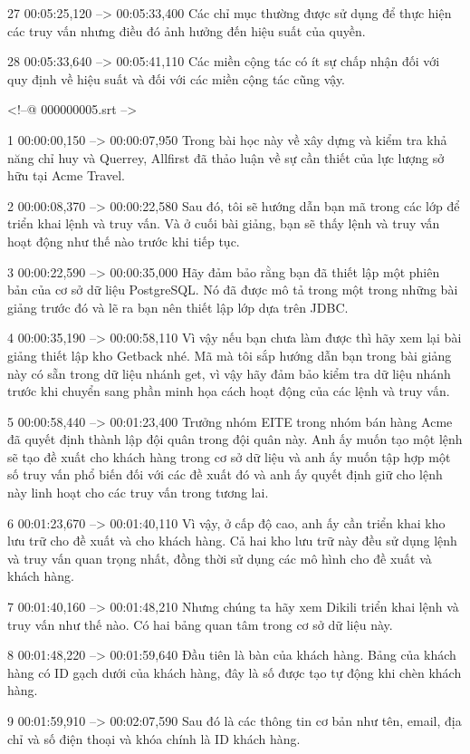 27
00:05:25,120 --> 00:05:33,400
Các chỉ mục thường được sử dụng để thực hiện các truy vấn nhưng điều đó ảnh hưởng đến hiệu suất của quyền.

28
00:05:33,640 --> 00:05:41,110
Các miền cộng tác có ít sự chấp nhận đối với quy định về hiệu suất và đối với các miền cộng tác cũng vậy.

<!--@ 000000005.srt -->

1
00:00:00,150 --> 00:00:07,950
Trong bài học này về xây dựng và kiểm tra khả năng chỉ huy và Querrey, Allfirst đã thảo luận về sự cần thiết của lực lượng sở hữu tại Acme Travel.

2
00:00:08,370 --> 00:00:22,580
Sau đó, tôi sẽ hướng dẫn bạn mã trong các lớp để triển khai lệnh và truy vấn.  Và ở cuối bài giảng, bạn sẽ thấy lệnh và truy vấn hoạt động như thế nào trước khi tiếp tục.

3
00:00:22,590 --> 00:00:35,000
Hãy đảm bảo rằng bạn đã thiết lập một phiên bản của cơ sở dữ liệu PostgreSQL.  Nó đã được mô tả trong một trong những bài giảng trước đó và lẽ ra bạn nên thiết lập lớp dựa trên JDBC.

4
00:00:35,190 --> 00:00:58,110
Vì vậy nếu bạn chưa làm được thì hãy xem lại bài giảng thiết lập kho Getback nhé.  Mã mà tôi sắp hướng dẫn bạn trong bài giảng này có sẵn trong dữ liệu nhánh get, vì vậy hãy đảm bảo kiểm tra dữ liệu nhánh trước khi chuyển sang phần minh họa cách hoạt động của các lệnh và truy vấn.

5
00:00:58,440 --> 00:01:23,400
Trưởng nhóm EITE trong nhóm bán hàng Acme đã quyết định thành lập đội quân trong đội quân này.  Anh ấy muốn tạo một lệnh sẽ tạo đề xuất cho khách hàng trong cơ sở dữ liệu và anh ấy muốn tập hợp một số truy vấn phổ biến đối với các đề xuất đó và anh ấy quyết định giữ cho lệnh này linh hoạt cho các truy vấn trong tương lai.

6
00:01:23,670 --> 00:01:40,110
Vì vậy, ở cấp độ cao, anh ấy cần triển khai kho lưu trữ cho đề xuất và cho khách hàng.  Cả hai kho lưu trữ này đều sử dụng lệnh và truy vấn quan trọng nhất, đồng thời sử dụng các mô hình cho đề xuất và khách hàng.

7
00:01:40,160 --> 00:01:48,210
Nhưng chúng ta hãy xem Dikili triển khai lệnh và truy vấn như thế nào.  Có hai bảng quan tâm trong cơ sở dữ liệu này.

8
00:01:48,220 --> 00:01:59,640
Đầu tiên là bàn của khách hàng.  Bảng của khách hàng có ID gạch dưới của khách hàng, đây là số được tạo tự động khi chèn khách hàng.

9
00:01:59,910 --> 00:02:07,590
Sau đó là các thông tin cơ bản như tên, email, địa chỉ và số điện thoại và khóa chính là ID khách hàng.

